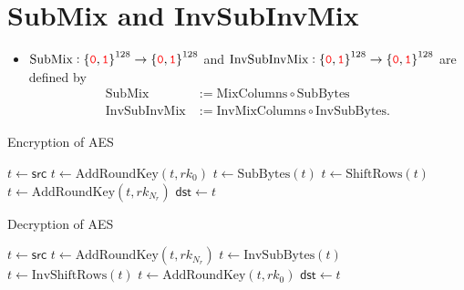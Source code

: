 \section{SubMix and InvSubInvMix}

\begin{itemize}
	\item $\text{SubMix}:\set{\textcolor{red}{\texttt{0}},\textcolor{red}{\texttt{1}}}^{128}\to\set{\textcolor{red}{\texttt{0}},\textcolor{red}{\texttt{1}}}^{128}$ and $\text{InvSubInvMix}:\set{\textcolor{red}{\texttt{0}},\textcolor{red}{\texttt{1}}}^{128}\to\set{\textcolor{red}{\texttt{0}},\textcolor{red}{\texttt{1}}}^{128}$ are defined by \begin{align*}
		\text{SubMix} &:= \text{MixColumns}\circ\text{SubBytes}\\
		\text{InvSubInvMix} &:= \text{InvMixColumns}\circ\text{InvSubBytes}.
	\end{align*}
\end{itemize}

\begin{algorithm}[H]
	\caption{Encryption of AES}
	
	\BlankLine
	$t \leftarrow \mathsf{src}$\;
	$t \leftarrow \text{AddRoundKey}(t, rk_0)$\;
	$t \leftarrow \text{SubBytes}(t)$\;
	$t \leftarrow \text{ShiftRows}(t)$\;
	$t \leftarrow \text{AddRoundKey}(t, rk_{N_r})$\;
	$\mathsf{dst} \leftarrow t$\;
	\;
\end{algorithm}
\vspace{24pt}
\begin{algorithm}[H]
	\caption{Decryption of AES}
	
	\BlankLine
	$t \leftarrow \mathsf{src}$\;
	$t \leftarrow \text{AddRoundKey}(t, rk_{N_r})$\;
	$t \leftarrow \text{InvSubBytes}(t)$\;
	$t \leftarrow \text{InvShiftRows}(t)$\;
	$t \leftarrow \text{AddRoundKey}(t, rk_{0})$\;
	$\mathsf{dst} \leftarrow t$\;
	\;
\end{algorithm}

